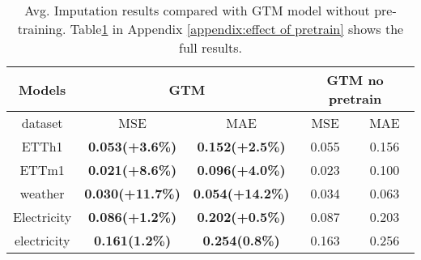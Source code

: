 \begin{table}[t]%
\centering
\caption{Avg. Imputation results compared with GTM model without pre-training. Table\ref{table:Imputation results GTM vs. GTM w/o} in Appendix \ref{appendix:effect of pretrain} shows the full results.}
\label{table:Imputation results GTM vs. GTM w/o}
\small  %
\setlength{\tabcolsep}{2pt} %
\renewcommand{\arraystretch}{0.8} %
\begin{tabular}{c|cc|cc}
\toprule
Models & \multicolumn{2}{c|}{\textbf{GTM}} & \multicolumn{2}{c}{\textbf{GTM no pretrain}} \\ \midrule
dataset & MSE & MAE & MSE & MAE \\\midrule
ETTh1 & \textbf{0.053(+3.6\%)} & \textbf{0.152(+2.5\%)} & 0.055 & 0.156 \\
ETTm1 & \textbf{0.021(+8.6\%)} & \textbf{0.096(+4.0\%)} & 0.023 & 0.100 \\
weather & \textbf{0.030(+11.7\%)} & \textbf{0.054(+14.2\%)} & 0.034 & 0.063 \\
Electricity & \textbf{0.086(+1.2\%)} & \textbf{0.202(+0.5\%)} & 0.087 & 0.203 \\
electricity & \textbf{0.161(1.2\%)} & \textbf{0.254(0.8\%)} & 0.163 & 0.256\\
            \bottomrule
\end{tabular}
\end{table}